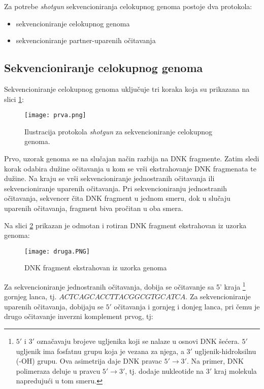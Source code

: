\documentclass[12pt,oneside]{memoir}
\begin{document}
Za potrebe \textit{shotgun} sekvencioniranja celokupnog genoma postoje dva protokola: 
\begin{itemize}
    \item {sekvencioniranje celokupnog genoma}
    \item {sekvencioniranje partner-uparenih očitavanja}
\end{itemize}

\newpage

\subsection{Sekvencioniranje celokupnog genoma}

Sekvencioniranje celokupnog genoma uključuje tri koraka koja su prikazana na slici \ref{fig:1}:


\begin{figure}[!ht]
  \centering
  \texttt{[image: prva.png]}
  \caption{Ilustracija protokola \textit{shotgun} za sekvencioniranje celokupnog genoma.}
\label{fig:1}
\end{figure}

Prvo, uzorak genoma se na slučajan način razbija na DNK fragmente. Zatim sledi korak odabira dužine očitavanja u kom se vrši ekstrahovanje DNK fragmenata te dužine. Na kraju se vrši sekvencioniranje jednostranih očitavanja ili sekvencioniranje uparenih očitavanja. Pri sekvencioniranju jednostranih očitavanja, sekvencer čita DNK fragment u jednom smeru, dok u slučaju uparenih očitavanja, fragment biva pročitan u oba smera.

Na slici \ref{fig:2} prikazan je odmotan i rotiran DNK fragment ekstrahovan iz uzorka genoma:

\begin{figure}[!ht]
  \centering
  \texttt{[image: druga.PNG]}
  \caption{DNK fragment ekstrahovan iz uzorka genoma}
  \label{fig:2}
\end{figure}

 Za sekvencioniranje jednostranih očitavanja, dobija se očitavanje sa 5' kraja \footnote{$5'$ i $3'$ označavaju brojeve ugljenika koji se nalaze u osnovi DNK šećera. $5'$ ugljenik ima fosfatnu grupu koja je vezana za njega, a $3'$ ugljenik-hidroksilnu (-OH) grupu. Ova asimetrija daje DNK pravac $5' \rightarrow 3'$. Na primer, DNK polimeraza deluje u pravcu $5' \rightarrow 3'$, tj. dodaje nukleotide na $3'$ kraj molekula napredujući u tom smeru.} gornjeg lanca, tj. $ACTCAGCACCTTACGGCGTGCATCA$. Za sekvencioniranje uparenih očitavanja, dobijaju se $5'$ očitavanja i gornjeg i donjeg lanca, pri čemu je drugo očitavanje inverzni komplement prvog, tj:
\end{document}
